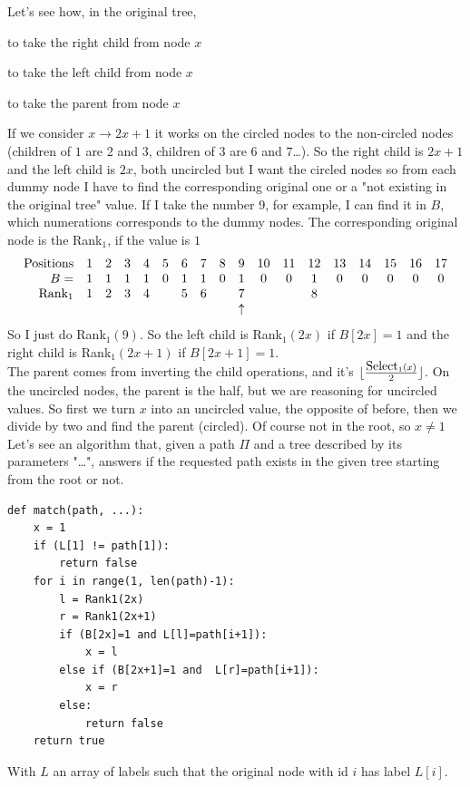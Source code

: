 \documentclass[10pt]{report}
\begin{document}
Let's see how, in the original tree, \begin{list}{}{}
	\item to take the right child from node $x$
	\item to take the left child from node $x$
	\item to take the parent from node $x$
\end{list}
If we consider $x \rightarrow 2x+1$ it works on the circled nodes to the non-circled nodes (children of $1$ are $2$ and $3$, children of $3$ are $6$ and $7$\ldots). So the right child is $2x + 1$ and the left child is $2x$, both uncircled but I want the circled nodes so from each dummy node I have to find the corresponding original one or a "not existing in the original tree" value. If I take the number 9, for example, I can find it in $B$, which numerations corresponds to the dummy nodes. The corresponding original node is the Rank$_1$, if the value is $1$
$$\begin{array}{r c c c c c c c c c c c c c c c c c}
	\hbox{Positions}&1&2&3&4&5&6&7&8&9&10&11&12&13&14&15&16&17\\
	B = &1&1&1&1&0&1&1&0&1&0&0&1&0&0&0&0&0\\
	\hbox{Rank}_1&1&2&3&4& &5&6& & 7 & & & 8\\
	& & & & & & & & &\uparrow
	\end{array}$$
	So I just do Rank$_1(9)$. So the left child is Rank$_1(2x)$ if $B[2x]=1$ and the right child is Rank$_1(2x+1)$ if $B[2x+1]=1$.\\
	The parent comes from inverting the child operations, and it's $\lfloor\frac{\hbox{Select}_1(x)}{2}\rfloor$. On the uncircled nodes, the parent is the half, but we are reasoning for uncircled values. So first we turn $x$ into an uncircled value, the opposite of before, then we divide by two and find the parent (circled). Of course not in the root, so $x\neq 1$\\
Let's see an algorithm that, given a path $\Pi$ and a tree described by its parameters "\ldots", answers if the requested path exists in the given tree starting from the root or not.
\begin{lstlisting}
def match(path, ...):
	x = 1
	if (L[1] != path[1]):
		return false
	for i in range(1, len(path)-1):
		l = Rank1(2x)
		r = Rank1(2x+1)
		if (B[2x]=1 and L[l]=path[i+1]):
			x = l
		else if (B[2x+1]=1 and  L[r]=path[i+1]):
			x = r
		else:
			return false
	return true
\end{lstlisting}
With $L$ an array of labels such that the original node with id $i$ has label $L[i]$.
\end{document}
